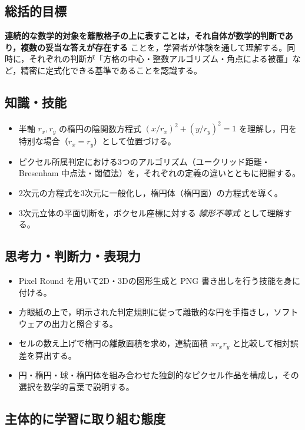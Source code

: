 \documentclass[12pt,a4paper]{scrartcl}
\newcommand{\acc}[1]{\textcolor{accent}{\textbf{#1}}}
\begin{document}
\subsection{総括的目標}

\acc{連続的な数学的対象を離散格子の上に表すことは，それ自体が数学的判断であり，複数の妥当な答えが存在する} ことを，学習者が体験を通して理解する。同時に，それぞれの判断が「方格の中心・整数アルゴリズム・角点による被覆」など，精密に定式化できる基準であることを認識する。

\subsection{知識・技能}

\begin{itemize}[leftmargin=1.3em,itemsep=0.15em,topsep=0.3em]
  \item 半軸 $r_x, r_y$ の楕円の陰関数方程式 $(x/r_x)^2 + (y/r_y)^2 = 1$ を理解し，円を特別な場合（$r_x = r_y$）として位置づける。
  \item ピクセル所属判定における3つのアルゴリズム（ユークリッド距離・Bresenham 中点法・閾値法）を，それぞれの定義の違いとともに把握する。
  \item 2次元の方程式を3次元に一般化し，楕円体（楕円面）の方程式を導く。
  \item 3次元立体の平面切断を，ボクセル座標に対する \emph{線形不等式} として理解する。
\end{itemize}

\subsection{思考力・判断力・表現力}

\begin{itemize}[leftmargin=1.3em,itemsep=0.15em,topsep=0.3em]
  \item Pixel Round を用いて2D・3Dの図形生成と PNG 書き出しを行う技能を身に付ける。
  \item 方眼紙の上で，明示された判定規則に従って離散的な円を手描きし，ソフトウェアの出力と照合する。
  \item セルの数え上げで楕円の離散面積を求め，連続面積 $\pi r_x r_y$ と比較して相対誤差を算出する。
  \item 円・楕円・球・楕円体を組み合わせた独創的なピクセル作品を構成し，その選択を数学的言葉で説明する。
\end{itemize}

\subsection{主体的に学習に取り組む態度}
\end{document}
